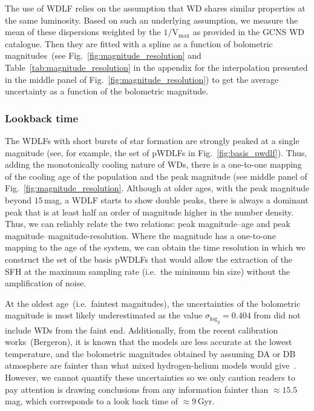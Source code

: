 \documentclass[fleqn,usenatbib]{mnras}
\begin{document}
The use of WDLF relies on the assumption that WD shares similar properties
at the same luminosity. Based on such an underlying assumption, we measure
the mean of these dispersions weighted by the $1/\mathrm{V}_{\mathrm{max}}$
as provided in the GCNS WD catalogue. Then they are fitted with a spline as
a function of bolometric magnitudes~(see Fig.~\ref{fig:magnitude_resolution}
and Table~\ref{tab:magnitude_resolution} in the appendix for the interpolation
presented in the middle panel of Fig.~\ref{fig:magnitude_resolution}) to get
the average uncertainty as a function of the bolometric magnitude.

\subsubsection{Lookback time}
The WDLFs with short bursts of star formation are strongly peaked at a single
magnitude (see, for example, the set of pWDLFs in Fig.~\ref{fig:basis_pwdlf}).
Thus, adding the monotonically cooling nature of WDs, there is a one-to-one
mapping of the cooling age of the population and the peak magnitude (see middle
panel of Fig.~\ref{fig:magnitude_resolution}. Although at older ages, with the
peak magnitude beyond $15$\,mag, a WDLF starts to show double peaks, there is
always a dominant peak that is at least half an order of magnitude higher in
the number density. Thus, we can reliably relate the two relations: peak
magnitude--age and peak magnitude--magnitude-resolution. Where the magnitude
has a one-to-one mapping to the age of the system, we can obtain the time
resolution in which we construct the set of the basis pWDLFs that would allow
the extraction of the SFH at the maximum sampling rate (i.e.\ the minimum bin
size) without the amplification of noise.

At the oldest age~(i.e.\ faintest magnitudes), the uncertainties of the
bolometric magnitude is most likely underestimated as the value
$\sigma_{\mathrm{log}_{g}} = 0.404$ from \citet{2014ApJ...796..128G} did not
include WDs from the faint end. Additionally, from the recent calibration
works~(Bergeron), it is known that the models are less accurate at the lowest 
temperature, and the bolometric magnitudes obtained by assuming DA or DB
atmosphere are fainter than what mixed hydrogen-helium models would
give~\citep{2022ApJ...934...36B}. However, we cannot quantify these uncertainties
so we only caution readers to pay attention is drawing conclusions from any
information fainter than $\approx15.5$\,mag, which corresponds to a look back
time of $\approx9$\,Gyr.
\end{document}
